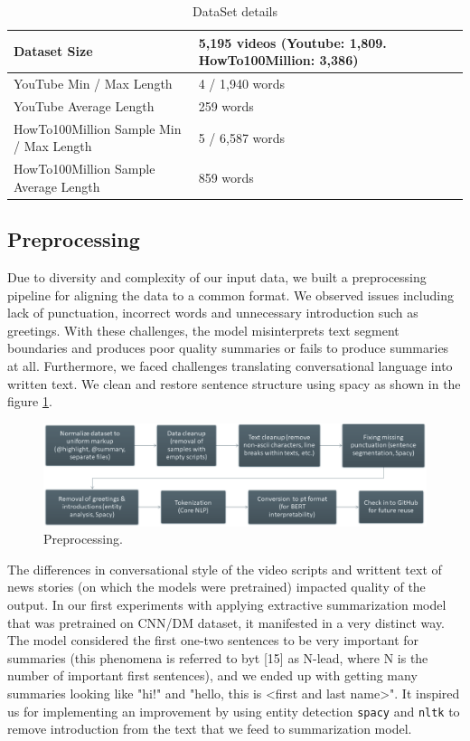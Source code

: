 \documentclass{article}
\begin{document}
\begin{table}[H]
  \caption{DataSet details}
  \label{dataset}
  \centering
  \begin{tabular}{llll}
    \toprule
  Dataset Size  &  5,195 videos (Youtube: 1,809. HowTo100Million: 3,386)    \\
 \midrule   
   YouTube Min / Max Length  &  4 / 1,940 words     \\
\midrule
YouTube Average Length & 259 words    \\
\midrule
  HowTo100Million Sample Min / Max Length & 5 / 6,587 words    \\
\midrule
HowTo100Million Sample Average Length & 859 words   \\
\bottomrule
  \end{tabular}
\end{table}

\subsection{Preprocessing}
\label{Preprocessing}

Due to diversity and complexity of our input data, we built a preprocessing pipeline for aligning the data to a common format. We observed issues including lack of punctuation, incorrect words and unnecessary introduction such as greetings. With these challenges, the model misinterprets text segment boundaries and produces poor quality summaries or fails to produce summaries at all. Furthermore, we faced challenges translating conversational language into written text. We clean and restore sentence structure using spacy as shown in the figure \ref{fig:preprocessing}.

\begin{figure}[H]
  \includegraphics[width=\linewidth]{preprocessing.PNG}
  \caption{Preprocessing.}
  \label{fig:preprocessing}
\end{figure}

The differences in conversational style of the video scripts and writtent text of news stories (on which the models were pretrained) impacted quality of the output. In our first experiments with applying extractive summarization model that was pretrained on CNN/DM dataset, it manifested in a very distinct way. The model considered the first one-two sentences to be very important for summaries (this phenomena is referred to byt [15] as N-lead, where N is the number of important first sentences), and we ended up with getting many summaries looking like "hi!" and "hello, this is <first and last name>". It inspired us for implementing an improvement by using entity detection   \verb+spacy+ and \verb+nltk+ to remove introduction from the text that we feed to summarization model.  
\end{document}
